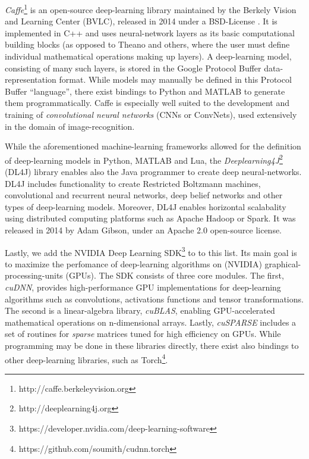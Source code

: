 \emph{Caffe}\footnote{http://caffe.berkeleyvision.org} is an open-source
deep-learning library maintained by the Berkely Vision and Learning Center
(BVLC), released in 2014 under a BSD-License \cite{caffe}. It is implemented in
C++ and uses neural-network layers as its basic computational building blocks
(as opposed to Theano and others, where the user must define individual
mathematical operations making up layers). A deep-learning model, consisting of
many such layers, is stored in the Google Protocol Buffer data-representation
format. While models may manually be defined in this Protocol Buffer
``language'', there exist bindings to Python and MATLAB to generate them
programmatically. Caffe is especially well suited to the development and
training of \emph{convolutional neural networks} (CNNs or ConvNets), used
extensively in the domain of image-recognition.

While the aforementioned machine-learning frameworks allowed for the definition
of deep-learning models in Python, MATLAB and Lua, the
\emph{Deeplearning4J}\footnote{http://deeplearning4j.org} (DL4J) library enables
also the Java programmer to create deep neural-networks. DL4J includes
functionality to create Restricted Boltzmann machines, convolutional and
recurrent neural networks, deep belief networks and other types of deep-learning
models. Moreover, DL4J enables horizontal scalabality using distributed
computing platforms such as Apache Hadoop or Spark. It was released in 2014 by
Adam Gibson, under an Apache 2.0 open-source license.

Lastly, we add the NVIDIA Deep Learning
SDK\footnote{https://developer.nvidia.com/deep-learning-software} to to this
list. Its main goal is to maximize the perfomance of deep-learning algorithms on
(NVIDIA) graphical-processing-units (GPUs). The SDK consists of three core
modules. The first, \emph{cuDNN}, provides high-performance GPU implementations
for deep-learning algorithms such as convolutions, activations functions and
tensor transformations. The second is a linear-algebra library, \emph{cuBLAS},
enabling GPU-accelerated mathematical operations on n-dimensional
arrays. Lastly, \emph{cuSPARSE} includes a set of routines for \emph{sparse}
matrices tuned for high efficiency on GPUs. While programming may be done in
these libraries directly, there exist also bindings to other deep-learning
libraries, such as Torch\footnote{https://github.com/soumith/cudnn.torch}.

